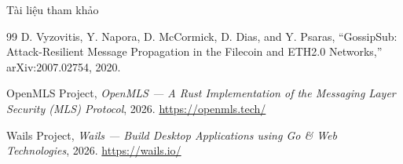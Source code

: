 \documentclass[t, aspectratio=169]{beamer}
\begin{document}
\begin{frame}[allowframebreaks]{Tài liệu tham khảo}
\begin{thebibliography}{99}
		D. Vyzovitis, Y. Napora, D. McCormick, D. Dias, and Y. Psaras,
		``GossipSub: Attack-Resilient Message Propagation in the Filecoin and ETH2.0 Networks,''
		arXiv:2007.02754, 2020.

		OpenMLS Project, \emph{OpenMLS --- A Rust Implementation of the Messaging Layer Security (MLS) Protocol}, 2026. \url{https://openmls.tech/}

		Wails Project, \emph{Wails --- Build Desktop Applications using Go \& Web Technologies}, 2026. \url{https://wails.io/}

	\end{thebibliography}
\end{frame}

\end{document}
